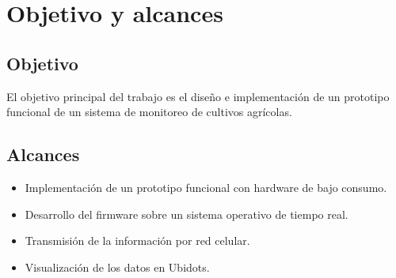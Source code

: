 \section{Objetivo y alcances}

\subsection{Objetivo}
El objetivo principal del trabajo es el diseño e implementación de un prototipo funcional de un sistema de monitoreo de cultivos agrícolas.
\subsection{Alcances}

\begin{itemize}
  \item Implementación de un prototipo funcional con hardware de bajo consumo. 	
  \item Desarrollo del firmware sobre un sistema operativo de tiempo real.
  \item Transmisión de la información por red celular.
  \item Visualización de los datos en Ubidots.
\end{itemize}